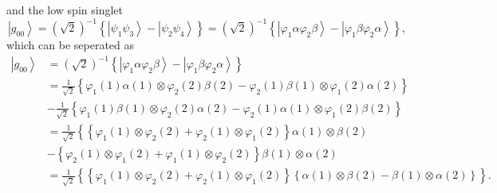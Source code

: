 \documentclass[aps,preprint]{revtex4}%
\begin{document}
and the low spin singlet%
\[
\left\vert g_{00}\right\rangle =\left(  \sqrt{2}\right)  ^{-1}\left\{
\left\vert \psi_{1}\psi_{3}\right\rangle -\left\vert \psi_{2}\psi
_{4}\right\rangle \right\}  =\left(  \sqrt{2}\right)  ^{-1}\left\{  \left\vert
\varphi_{1}\alpha\varphi_{2}\beta\right\rangle -\left\vert \varphi_{1}%
\beta\varphi_{2}\alpha\right\rangle \right\}  ,
\]
which can be seperated as%
\begin{align}
\left\vert g_{00}\right\rangle  &  =\left(  \sqrt{2}\right)  ^{-1}\left\{
\left\vert \varphi_{1}\alpha\varphi_{2}\beta\right\rangle -\left\vert
\varphi_{1}\beta\varphi_{2}\alpha\right\rangle \right\} \nonumber\\
&  =\frac{1}{\sqrt{2}}\left\{  \varphi_{1}\left(  1\right)  \alpha\left(
1\right)  \otimes\varphi_{2}\left(  2\right)  \beta\left(  2\right)
-\varphi_{2}\left(  1\right)  \beta\left(  1\right)  \otimes\varphi_{1}\left(
2\right)  \alpha\left(  2\right)  \right\} \nonumber\\
&  -\frac{1}{\sqrt{2}}\left\{  \varphi_{1}\left(  1\right)  \beta\left(
1\right)  \otimes\varphi_{2}\left(  2\right)  \alpha\left(  2\right)
-\varphi_{2}\left(  1\right)  \alpha\left(  1\right)  \otimes\varphi
_{1}\left(  2\right)  \beta\left(  2\right)  \right\} \nonumber\\
&  =\frac{1}{\sqrt{2}}\left\{  \left\{  \varphi_{1}\left(  1\right)
\otimes\varphi_{2}\left(  2\right)  +\varphi_{2}\left(  1\right)
\otimes\varphi_{1}\left(  2\right)  \right\}  \alpha\left(  1\right)
\otimes\beta\left(  2\right)  \right. \nonumber\\
&  -\left\{  \varphi_{2}\left(  1\right)  \otimes\varphi_{1}\left(  2\right)
+\varphi_{1}\left(  1\right)  \otimes\varphi_{2}\left(  2\right)  \right\}
\beta\left(  1\right)  \otimes\alpha\left(  2\right) \nonumber\\
&  =\frac{1}{\sqrt{2}}\left\{  \left\{  \varphi_{1}\left(  1\right)
\otimes\varphi_{2}\left(  2\right)  +\varphi_{2}\left(  1\right)
\otimes\varphi_{1}\left(  2\right)  \right\}  \left\{  \alpha\left(  1\right)
\otimes\beta\left(  2\right)  -\beta\left(  1\right)  \otimes\alpha\left(
2\right)  \right\}  \right\}  .
\end{align}
\end{document}
